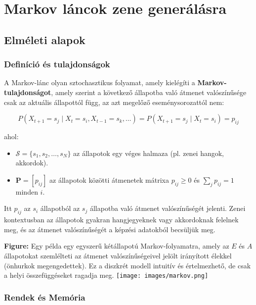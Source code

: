 \chapter{Markov láncok zene generálásra}
\label{chap:markov}

\section{Elméleti alapok}

\subsection{Definíció és tulajdonságok}

A Markov-lánc olyan sztochasztikus folyamat, amely kielégíti a \textbf{Markov-tulajdonságot}, amely szerint a következő állapotba való átmenet valószínűsége csak az aktuális állapottól függ, az azt megelőző eseménysorozattól nem:

\[
P(X_{t+1} = s_j \mid X_t = s_i, X_{t-1} = s_k, \dots) = P(X_{t+1} = s_j \mid X_t = s_i) = p_{ij}
\]

ahol:
\begin{itemize}
    \item \( \mathcal{S} = \{s_1, s_2, \dots, s_N\} \) az állapotok egy véges halmaza (pl. zenei hangok, akkordok).
    \item \( \mathbf{P} = [p_{ij}] \) az állapotok közötti átmenetek mátrixa \( p_{ij} \geq 0 \) és \( \sum_j p_{ij} = 1 \) minden \( i \).
\end{itemize}

Itt \( p_{ij} \) az \( s_i \) állapotból az \( s_j \) állapotba való átmenet valószínűségét jelenti. Zenei kontextusban az állapotok gyakran hangjegyeknek vagy akkordoknak felelnek meg, és az átmenet valószínűségét a képzési adatokból becsüljük meg.

\vspace{1em}
\noindent\textbf{Figure:} Egy példa egy egyszerű kétállapotú Markov-folyamatra, amely az \( E \) és \( A \) állapotokat szemlélteti az átmenet valószínűségeivel jelölt irányított élekkel (önhurkok megengedettek). Ez a diszkrét modell intuitív és értelmezhető, de csak a helyi összefüggéseket ragadja meg. \hfill
\texttt{[image: images/markov.png]}
\label{fig:markov}
\vspace{1em}

\subsection{Rendek és Memória}

